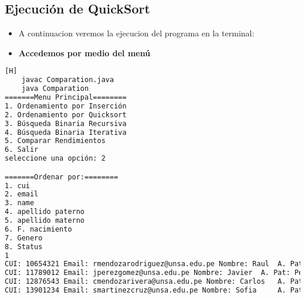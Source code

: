 \subsection{Ejecución de QuickSort}
\begin{itemize}
  \item A continuacion veremos la ejecucion del programa en la terminal:
  \item \textbf{Accedemos por medio del menú}
  \end{itemize}
   	\begin{lstlisting}[language=bash,caption={Compilación y ejecución del código}][H]
    javac Comparation.java
    java Comparation
=======Menu Principal========
1. Ordenamiento por Inserción
2. Ordenamiento por Quicksort
3. Búsqueda Binaria Recursiva
4. Búsqueda Binaria Iterativa
5. Comparar Rendimientos
6. Salir
seleccione una opción: 2

=======Ordenar por:========
1. cui
2. email
3. name
4. apellido paterno
5. apellido materno
6. F. nacimiento
7. Genero
8. Status
1
CUI: 10654321 Email: rmendozarodriguez@unsa.edu.pe Nombre: Raul	 A. Pat: Mendoza A. Mat: Rodriguez Fecha de Nacimiento: 1992-08-07 Genero: 0 Estado: 1
CUI: 11789012 Email: jperezgomez@unsa.edu.pe Nombre: Javier	 A. Pat: Perez A. Mat: Gomez Fecha de Nacimiento: 1990-12-30 Genero: 0 Estado: 1
CUI: 12876543 Email: cmendozarivera@unsa.edu.pe Nombre: Carlos	 A. Pat: Mendoza A. Mat: Rivera Fecha de Nacimiento: 1991-03-05 Genero: 0 Estado: 1
CUI: 13901234 Email: smartinezcruz@unsa.edu.pe Nombre: Sofia	 A. Pat: Martinez A. Mat: Cruz Fecha de Nacimiento: 1994-05-18 Genero: 0 Estado: 1

  \end{lstlisting}

